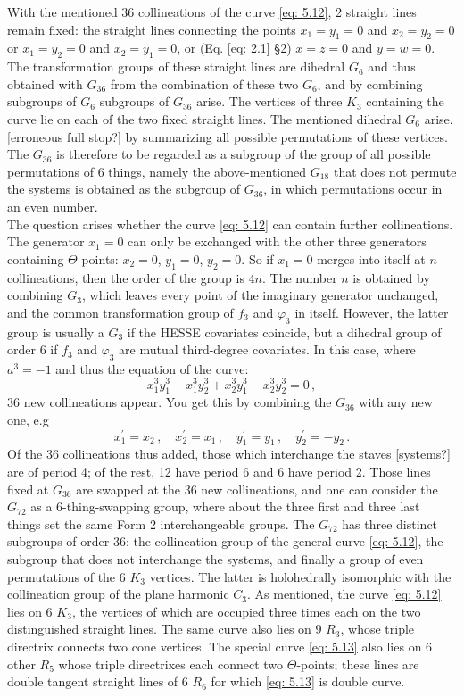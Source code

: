 \documentclass[leqno]{article}
\begin{document}
With the mentioned 36 collineations of the curve \eqref{eq: 5.12}, 2 straight lines remain fixed: the straight lines connecting the points $x_1 = y_1 = 0$ and $x_2 = y_2 = 0$ or $x_1 = y_2 = 0$ and $x_2 = y_1 = 0$, or (Eq. \eqref{eq: 2.1} \S 2) $x=z=0$ and $y=w=0$. The transformation groups of these straight lines are dihedral $G_6$ and thus obtained with $G_{36}$ from the combination of these two $G_6$, and by combining subgroups of $G_6$ subgroups of $G_{36}$ arise. The vertices of three $K_3$ containing the curve lie on each of the two fixed straight lines. The mentioned dihedral $G_6$ arise. [erroneous full stop?] by summarizing all possible permutations of these vertices. The $G_{36}$ is therefore to be regarded as a subgroup of the group of all possible permutations of 6 things, namely the above-mentioned $G_{18}$ that does not permute the systems is obtained as the subgroup of $G_{36}$, in which permutations occur in an even number. \\
The question arises whether the curve \eqref{eq: 5.12} can contain further collineations. The generator $x_1=0$ can only be exchanged with the other three generators containing $\Theta$-points: $x_2=0$, $y_1=0$, $y_2=0$. So if $x_1=0$ merges into itself at $n$ collineations, then the order of the group is $4n$. The number $n$ is obtained by combining $G_3$, which leaves every point of the imaginary generator unchanged, and the common transformation group of $f_3$ and $\varphi_3$ in itself. However, the latter group is usually a $G_3$ if the HESSE covariates coincide, but a dihedral group of order 6 if $f_3$ and $\varphi_3$ are mutual third-degree covariates. In this case, where $a^3=-1$ and thus the equation of the curve: 
\begin{equation}\label{eq: 5.13}
x_1^3 y_1^3 + x_1^3 y_2^3 + x_2^3 y_1^3 - x_2^3 y_2^3 = 0 \, , \tag{13}
\end{equation} 36 new collineations appear. You get this by combining the $G_{36}$ with any new one, e.g
\[
x_1^\prime = x_2 \, , \quad x_2^\prime = x_1 \, , \quad y_1^\prime = y_1 \, , \quad y_2^\prime = - y_2 \, . 
\]
Of the 36 collineations thus added, those which interchange the staves [systems?] are of period 4; of the rest, 12 have period 6 and 6 have period 2. Those lines fixed at $G_{36}$ are swapped at the 36 new collineations, and one can consider the $G_{72}$ as a 6-thing-swapping group, where about the three first and three last things set the same Form 2 interchangeable groups. The $G_{72}$ has three distinct subgroups of order 36: the collineation group of the general curve \eqref{eq: 5.12}, the subgroup that does not interchange the systems, and finally a group of even permutations of the 6 $K_3$ vertices. The latter is holohedrally isomorphic with the collineation group of the plane harmonic $C_3$. As mentioned, the curve \eqref{eq: 5.12} lies on 6 $K_3$, the vertices of which are occupied three times each on the two distinguished straight lines. The same curve also lies on 9 $R_3$, whose triple directrix connects two cone vertices. The special curve \eqref{eq: 5.13} also lies on 6 other $R_5$ whose triple directrixes each connect two $\Theta$-points; these lines are double tangent straight lines of 6 $R_6$ for which \eqref{eq: 5.13} is double curve. \\
\end{document}
